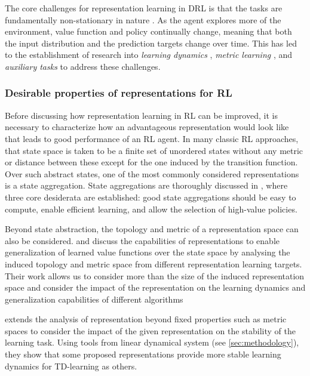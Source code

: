 The core challenges for representation learning in DRL is that the tasks are fundamentally non-stationary in nature \parencite{Kumar2021-zu,nikishin2022primacy}.
As the agent explores more of the environment, value function and policy continually change, meaning that both the input distribution and the prediction targets change over time.
This has led to the establishment of research into \emph{learning dynamics} \parencite{lyle2021earning,Lyle2022-st}, \emph{metric learning} \parencite{ferns2011bisimulation,barreto2017successor,borsa2018universal,le2021metrics}, and \emph{auxiliary tasks} \parencite{jaderberg2017reinforcement,Bellemare2019-eo,lyle2021effect,farebrother2023protovalue} to address these challenges.

\subsubsection{Desirable properties of representations for RL}

Before discussing how representation learning in RL can be improved, it is necessary to characterize how an advantageous representation would look like that leads to good performance of an RL agent.
In many classic RL approaches, that state space is taken to be a finite set of unordered states without any metric or distance between these except for the one induced by the transition function.
Over such abstract states, one of the most commonly considered representations is a state aggregation.
State aggregations are thoroughly discussed in \textcite{abel2020thesis}, where three core desiderata are established: good state aggregations should be easy to compute, enable efficient learning, and allow the selection of high-value policies.

Beyond state abstraction, the topology and metric of a representation space can also be considered. 
\textcite{le2021metrics} and \textcite{le2022generalization} discuss the capabilities of representations to enable generalization of learned value functions over the state space by analysing the induced topology and metric space from different representation learning targets.
Their work allows us to consider more than the size of the induced representation space and consider the impact of the representation on the learning dynamics and generalization capabilities of different algorithms

\textcite{ghosh2020representations} extends the analysis of representation beyond fixed properties such as metric spaces to consider the impact of the given representation on the stability of the learning task.
Using tools from linear dynamical system (see \autoref{sec:methodology}), they show that some proposed representations provide more stable learning dynamics for TD-learning as others.

